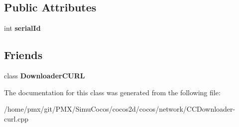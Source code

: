 \subsection*{Public Attributes}
\begin{DoxyCompactItemize}
\item 
\mbox{\label{classcocos2d_1_1network_1_1DownloadTaskCURL_ae5de9d70d125ff70f6662056600ba4be}} 
int {\bfseries serial\+Id}
\end{DoxyCompactItemize}
\subsection*{Friends}
\begin{DoxyCompactItemize}
\item 
\mbox{\label{classcocos2d_1_1network_1_1DownloadTaskCURL_a419d8b9dc38965314f0a998a69f03407}} 
class {\bfseries Downloader\+C\+U\+RL}
\end{DoxyCompactItemize}


The documentation for this class was generated from the following file\+:\begin{DoxyCompactItemize}
\item 
/home/pmx/git/\+P\+M\+X/\+Simu\+Cocos/cocos2d/cocos/network/C\+C\+Downloader-\/curl.\+cpp\end{DoxyCompactItemize}
